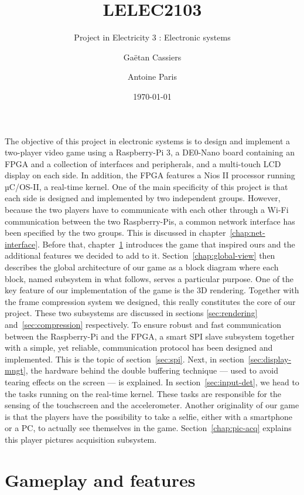 \documentclass[english, DIV=13]{scrreprt}
\title{LELEC2103}
\subtitle{Project in Electricity 3 : Electronic systems}
\author{Gaëtan Cassiers\and Antoine Paris}
\date{\today}
\begin{document}
\maketitle
\tableofcontents

The objective of this project in electronic systems is to design and implement a
two-player video game using a Raspberry-Pi 3, a DE0-Nano board containing an FPGA
and a collection of interfaces and peripherals, and a multi-touch LCD display on
each side. In addition, the FPGA features a Nios II processor running µC/OS-II, a
real-time kernel.
One of the main specificity of this project is that each side is designed and
implemented by two independent groups. However, because the two players have to
communicate with
each other through a Wi-Fi communication between the two Raspberry-Pis, a common
network interface has been specified by the two groups. This is discussed
in chapter~\ref{chap:net-interface}. Before that, chapter~\ref{chap:gameplay-features}
introduces the game that inspired ours and the additional features we decided to
add to it. Section~\ref{chap:global-view} then describes the global architecture of
our game as a block diagram where each block, named subsystem in what follows, serves a
particular purpose. One of the key feature of our implementation of the game is the
3D rendering. Together with the frame compression system we designed, this really
constitutes the core of our project. These two subsystems are discussed in sections
\ref{sec:rendering} and~\ref{sec:compression} respectively.
To ensure robust and fast communication between the Raspberry-Pi and the FPGA, a smart
SPI slave subsystem together with a simple, yet reliable, communication protocol has
been designed and implemented. This is the topic of section~\ref{sec:spi}. Next, in
section~\ref{sec:display-mngt}, the hardware behind the double buffering technique
--- used to avoid tearing effects on the screen --- is explained.
In section~\ref{sec:input-det}, we head to the tasks running on the real-time kernel.
These tasks are responsible for the sensing of the touchscreen and the accelerometer.
Another originality of our game is that the players have the possibility to take a
selfie, either with a smartphone or a PC, to actually see themselves in the game.
Section~\ref{chap:pic-acq} explains this player pictures acquisition subsystem.

\chapter{Gameplay and features}
\label{chap:gameplay-features}
\end{document}
